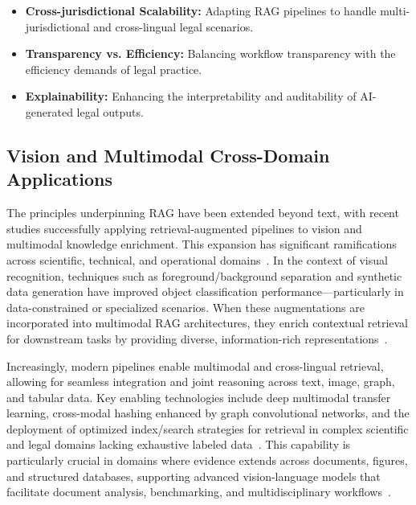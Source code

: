 \begin{itemize}
    \item \textbf{Cross-jurisdictional Scalability:} Adapting RAG pipelines to handle multi-jurisdictional and cross-lingual legal scenarios.
    \item \textbf{Transparency vs. Efficiency:} Balancing workflow transparency with the efficiency demands of legal practice.
    \item \textbf{Explainability:} Enhancing the interpretability and auditability of AI-generated legal outputs.
\end{itemize}

\subsection{Vision and Multimodal Cross-Domain Applications}

The principles underpinning RAG have been extended beyond text, with recent studies successfully applying retrieval-augmented pipelines to vision and multimodal knowledge enrichment. This expansion has significant ramifications across scientific, technical, and operational domains~\cite{ref3,ref5,ref14,ref15,ref20,ref21,ref23,ref24,ref28,ref29,ref30,ref31,ref33,ref36,ref37,ref38,ref39,ref40,ref43,ref45,ref48,ref52,ref54,ref55,ref61,ref62}. In the context of visual recognition, techniques such as foreground/background separation and synthetic data generation have improved object classification performance—particularly in data-constrained or specialized scenarios. When these augmentations are incorporated into multimodal RAG architectures, they enrich contextual retrieval for downstream tasks by providing diverse, information-rich representations~\cite{ref62}.

Increasingly, modern pipelines enable multimodal and cross-lingual retrieval, allowing for seamless integration and joint reasoning across text, image, graph, and tabular data. Key enabling technologies include deep multimodal transfer learning, cross-modal hashing enhanced by graph convolutional networks, and the deployment of optimized index/search strategies for retrieval in complex scientific and legal domains lacking exhaustive labeled data~\cite{ref14,ref15,ref61,ref62}. This capability is particularly crucial in domains where evidence extends across documents, figures, and structured databases, supporting advanced vision-language models that facilitate document analysis, benchmarking, and multidisciplinary workflows~\cite{ref5,ref14,ref28,ref33,ref36,ref37,ref38,ref39,ref40,ref43,ref45,ref54,ref55}.

